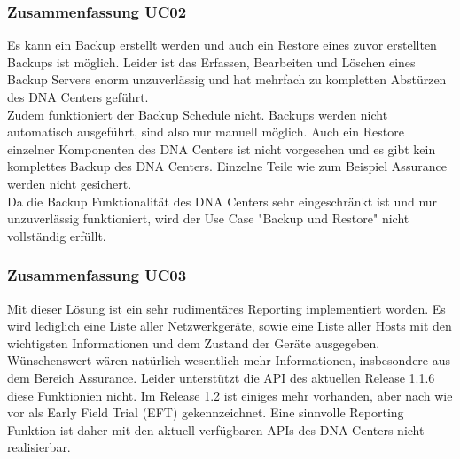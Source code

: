\begin{landscape}
\subsubsection{Zusammenfassung UC02}
Es kann ein Backup erstellt werden und auch ein Restore eines zuvor erstellten Backups ist möglich. Leider ist das Erfassen, Bearbeiten und Löschen eines Backup Servers enorm unzuverlässig und hat mehrfach zu kompletten Abstürzen des DNA Centers geführt. \\
Zudem funktioniert der Backup Schedule nicht. Backups werden nicht automatisch ausgeführt, sind also nur manuell möglich. Auch ein Restore einzelner Komponenten des DNA Centers ist nicht vorgesehen und es gibt kein komplettes Backup des DNA Centers. Einzelne Teile wie zum Beispiel Assurance werden nicht gesichert. \\
Da die Backup Funktionalität des DNA Centers sehr eingeschränkt ist und nur unzuverlässig funktioniert, wird der Use Case "Backup und Restore" nicht vollständig erfüllt.
\pagebreak


\subsubsection{Zusammenfassung UC03}
Mit dieser Lösung ist ein sehr rudimentäres Reporting implementiert worden. Es wird lediglich eine Liste aller Netzwerkgeräte, sowie eine Liste aller Hosts mit den wichtigsten Informationen und dem Zustand der Geräte ausgegeben. Wünschenswert wären natürlich wesentlich mehr Informationen, insbesondere aus dem Bereich Assurance. Leider unterstützt die API des aktuellen Release 1.1.6 diese Funktionien nicht. Im Release 1.2 ist einiges mehr vorhanden, aber nach wie vor als Early Field Trial (EFT) gekennzeichnet. 
Eine sinnvolle Reporting Funktion ist daher mit den aktuell verfügbaren APIs des DNA Centers nicht realisierbar.
\pagebreak


\end{landscape}
